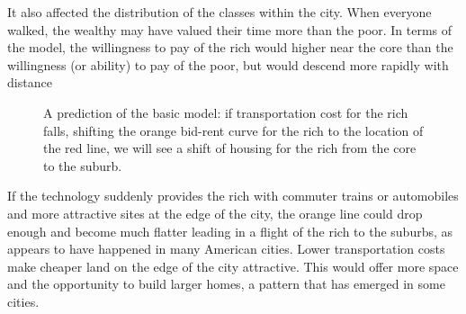 It also affected the distribution of the classes within the city. When everyone walked, the  wealthy may have valued their time more than the poor. In terms of the model, the willingness to pay of the rich would higher  near the core than  the willingness (or ability) to pay of  the poor, but would descend more rapidly with distance
\begin{figure}
\begin{center}
\end{center}
\caption{A prediction of the basic model: if transportation cost for the rich falls, shifting the orange  bid-rent curve for the rich to the location of the red line, we will see a shift of housing for the rich  from the core to the suburb.}
\end{figure}

 If the technology suddenly provides the rich with commuter trains or automobiles and more attractive sites at the edge of the city, the orange line could drop enough  and become much flatter leading in a flight of the rich to the suburbs, as appears to have happened in many American cities. Lower transportation costs make cheaper land on the edge of the city attractive. This would  offer  more space and the opportunity to build larger homes, a pattern that has emerged in some cities.

